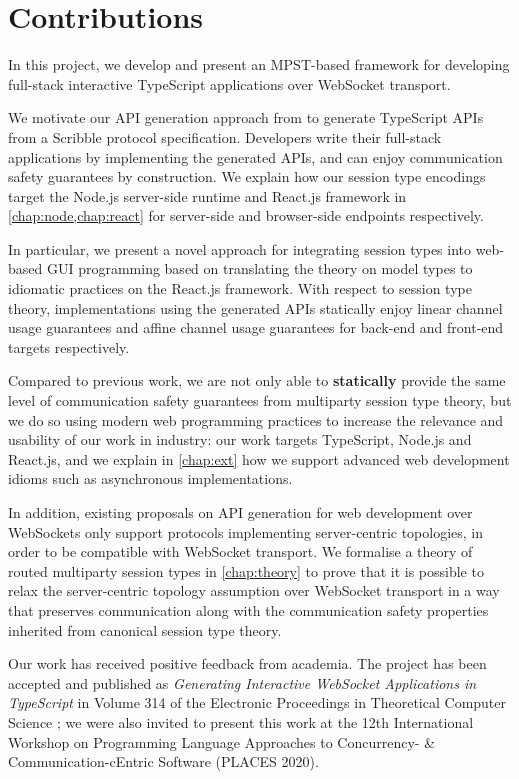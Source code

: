 \section{Contributions}

In this project, we develop and present an
MPST-based framework for developing full-stack
interactive TypeScript applications over WebSocket transport.

We motivate our API generation approach from 
\cite{Hybrid2016,PureScript2019} to generate TypeScript APIs
from a Scribble protocol specification.
Developers write their full-stack applications
by implementing the generated APIs, and can enjoy 
communication safety guarantees by construction.
We explain how our session type encodings target the Node.js
server-side runtime and React.js framework in
\cref{chap:node,chap:react} for server-side
and browser-side endpoints respectively.

In particular, we present a novel approach for integrating
session types into web-based GUI programming based on
translating the theory on model types \cite{MVU2020}
to idiomatic practices on the React.js framework.
With respect to session type theory, implementations using
the generated APIs statically enjoy linear channel usage
guarantees and affine channel usage guarantees for back-end
and front-end targets respectively.

Compared to previous work, we are not only able to
\textbf{statically} provide the same level of communication safety
guarantees from multiparty session type theory, but we do so
using modern web programming practices to increase
the relevance and usability of our work in industry:
our work targets TypeScript, Node.js and React.js,
and we explain in \cref{chap:ext} how we support advanced
web development idioms such as asynchronous implementations.

In addition, existing proposals on API generation for web development
over WebSockets \cite{PureScript2019} only support protocols
implementing server-centric topologies, in order to be 
compatible with WebSocket transport.
We formalise a theory of routed multiparty session types in 
\cref{chap:theory} to prove that it is possible to relax the
server-centric topology assumption over WebSocket transport in a way 
that preserves communication along with the communication safety 
properties inherited from canonical session type theory.

Our work has received positive feedback from academia.
The project has been accepted and published as 
\emph{Generating Interactive WebSocket Applications in TypeScript}
in Volume 314 of the Electronic Proceedings in Theoretical
Computer Science \cite{PLACES2020}; we were also invited to present this work
at the 12th International Workshop on
Programming Language Approaches to Concurrency- \& 
Communication-cEntric Software (PLACES 2020).

